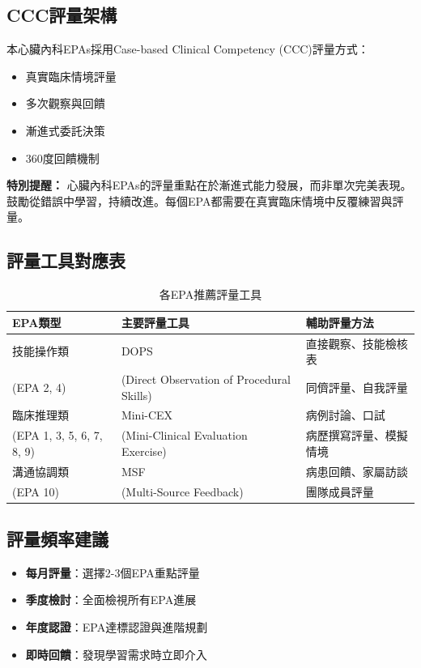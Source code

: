 \documentclass[12pt,a4paper]{article}
\begin{document}
\subsection{CCC評量架構}
本心臟內科EPAs採用Case-based Clinical Competency (CCC)評量方式：
\begin{itemize}[nosep]
    \item 真實臨床情境評量
    \item 多次觀察與回饋
    \item 漸進式委託決策
    \item 360度回饋機制
\end{itemize}

\begin{importantbox}
\textbf{特別提醒：} 心臟內科EPAs的評量重點在於漸進式能力發展，而非單次完美表現。鼓勵從錯誤中學習，持續改進。每個EPA都需要在真實臨床情境中反覆練習與評量。
\end{importantbox}

\subsection{評量工具對應表}
\begin{table}[h]
    \centering
    \caption{各EPA推薦評量工具}
    \begin{tabular}{p{4cm} p{4cm} p{6cm}}
        \toprule
        \textbf{EPA類型} & \textbf{主要評量工具} & \textbf{輔助評量方法} \\
        \midrule
        技能操作類 & DOPS & 直接觀察、技能檢核表 \\
        (EPA 2, 4) & (Direct Observation of Procedural Skills) & 同儕評量、自我評量 \\
        \midrule
        臨床推理類 & Mini-CEX & 病例討論、口試 \\
        (EPA 1, 3, 5, 6, 7, 8, 9) & (Mini-Clinical Evaluation Exercise) & 病歷撰寫評量、模擬情境 \\
        \midrule
        溝通協調類 & MSF & 病患回饋、家屬訪談 \\
        (EPA 10) & (Multi-Source Feedback) & 團隊成員評量 \\
        \bottomrule
    \end{tabular}
\end{table}

\subsection{評量頻率建議}
\begin{itemize}[nosep]
    \item \textbf{每月評量}：選擇2-3個EPA重點評量
    \item \textbf{季度檢討}：全面檢視所有EPA進展
    \item \textbf{年度認證}：EPA達標認證與進階規劃
    \item \textbf{即時回饋}：發現學習需求時立即介入
\end{itemize}
\end{document}
